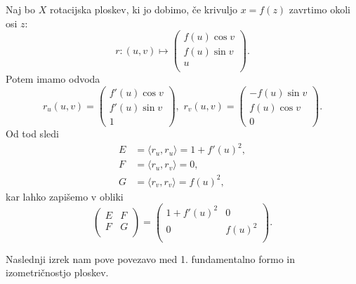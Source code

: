 \begin{primer}
 Naj bo $X$ rotacijska ploskev, ki jo dobimo, če krivuljo $x =  f(z)$
 zavrtimo okoli osi $z$: 
 \begin{equation*} r: \left( u,v \right) \mapsto  
\begin{pmatrix}
	f(u) \cos v \\
	f(u) \sin v \\
	u \\
\end{pmatrix}
.\end{equation*}Potem imamo odvoda 
\begin{equation*}   r_u(u,v) = \begin{pmatrix} f'(u) \cos v \\ f'(u) \sin v \\ 1
\end{pmatrix}, \,\,  r_v(u,v) = 
\begin{pmatrix}-f(u) \sin  v \\ f(u) \cos v \\ 0
\end{pmatrix}.\end{equation*}
Od tod sledi 
\begin{align*}
    E &= \langle r_u, r_u \rangle = 1 + f'(u)^2, \\
    F &= \langle r_u, r_v \rangle = 0, \\
	G &= \langle r_v, r_v \rangle = f(u)^2,
\end{align*}
kar lahko zapišemo v obliki 
\begin{equation*} 
\begin{pmatrix}
	E & F \\
	F & G \\
\end{pmatrix}
=
\begin{pmatrix}
	1 + f'(u)^2 & 0 \\
	0 & f(u)^2 \\
\end{pmatrix}
.
\end{equation*}
\end{primer}

Naslednji izrek nam pove povezavo med 1. fundamentalno formo in
izometričnostjo ploskev.

